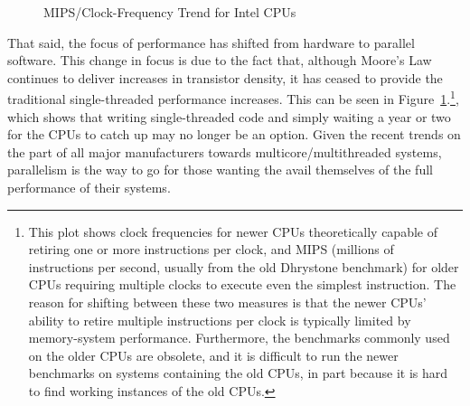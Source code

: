 \begin{figure}[tb]
\begin{center}
\end{center}
\caption{MIPS/Clock-Frequency Trend for Intel CPUs}
\label{fig:intro:Clock-Frequency Trend for Intel CPUs}
\end{figure}

That said, the focus of performance has shifted from hardware to
parallel software.
This change in focus is due to the fact that, although Moore's Law
continues to deliver increases in transistor density, it has ceased to
provide the traditional single-threaded performance increases.
This can be seen in
Figure~\ref{fig:intro:Clock-Frequency Trend for Intel CPUs}.\footnote{	
	This plot shows clock frequencies for newer CPUs theoretically
	capable of retiring one or more instructions per clock, and MIPS
	(millions of instructions per second, usually from the old
	Dhrystone benchmark)
	for older CPUs requiring multiple clocks to execute even the
	simplest instruction.
	The reason for shifting between these two measures is that the
	newer CPUs' ability to retire multiple instructions per clock is
	typically limited by memory-system performance.
	Furthermore, the benchmarks commonly used on the older CPUs
	are obsolete, and it is difficult to run the newer benchmarks
	on systems containing the old CPUs, in part because it is hard
	to find working instances of the old CPUs.},
which shows that writing single-threaded code and simply waiting
a year or two for the CPUs to catch up may no longer be an option.
Given the recent trends on the part of all major manufacturers towards
multicore/multithreaded systems, parallelism is the way to go for
those wanting the avail themselves of the full performance of their
systems.

